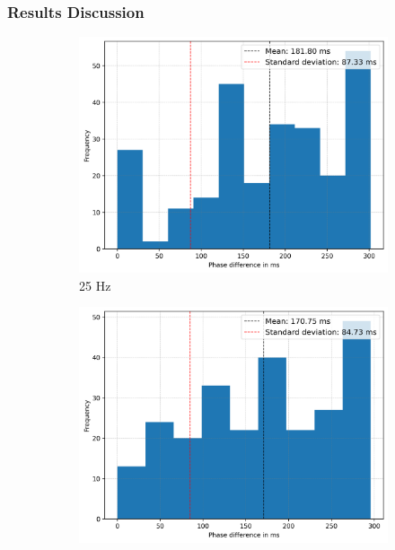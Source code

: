 \subsubsection{Results Discussion}
\begin{figure}[t]
    \begin{subfigure}{0.5\linewidth}
        \centering
        \includegraphics[width=\linewidth]{chapters/Results/histogram_25.png}
        \caption{25 Hz}
        \label{fig:histogram_25}
        \vspace{1\baselineskip}
    \end{subfigure}
    \begin{subfigure}{0.5\linewidth}
        \centering
        \includegraphics[width=\linewidth]{chapters/Results/histogram_50.png}

\end{subfigure}
\end{figure}
